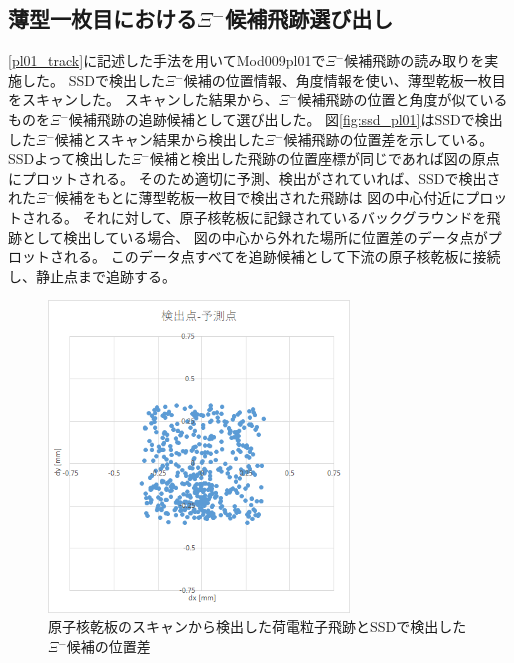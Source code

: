 \documentclass[12pt,a4paper]{jarticle}
\begin{document}
\subsection{薄型一枚目における$\Xi$$^-$候補飛跡選び出し}
\ref{pl01_track}に記述した手法を用いてMod009pl01で$\Xi$$^-$候補飛跡の読み取りを実施した。
SSDで検出した$\Xi$$^-$候補の位置情報、角度情報を使い、薄型乾板一枚目をスキャンした。
スキャンした結果から、$\Xi$$^-$候補飛跡の位置と角度が似ているものを$\Xi$$^-$候補飛跡の追跡候補として選び出した。
図\ref{fig:ssd_pl01}はSSDで検出した$\Xi$$^-$候補とスキャン結果から検出した$\Xi$$^-$候補飛跡の位置差を示している。
SSDよって検出した$\Xi$$^-$候補と検出した飛跡の位置座標が同じであれば図の原点にプロットされる。
そのため適切に予測、検出がされていれば、SSDで検出された$\Xi$$^-$候補をもとに薄型乾板一枚目で検出された飛跡は
図の中心付近にプロットされる。
それに対して、原子核乾板に記録されているバックグラウンドを飛跡として検出している場合、
図の中心から外れた場所に位置差のデータ点がプロットされる。
このデータ点すべてを追跡候補として下流の原子核乾板に接続し、静止点まで追跡する。
\begin{figure}[htbp]
  \centering
     \includegraphics[width=80mm]{dx_dy.png}
  \caption{原子核乾板のスキャンから検出した荷電粒子飛跡とSSDで検出した$\Xi$$^-$候補の位置差}
\end{figure}
\end{document}
